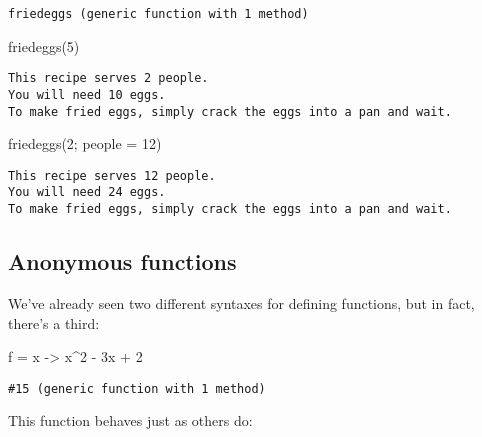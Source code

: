 \documentclass[
  letterpaper,
  DIV=11,
  numbers=noendperiod]{scrreprt}
\newenvironment{Shaded}{\begin{snugshade}}{\end{snugshade}}
\newcommand{\FloatTok}[1]{\textcolor[rgb]{0.68,0.00,0.00}{#1}}
\newcommand{\FunctionTok}[1]{\textcolor[rgb]{0.28,0.35,0.67}{#1}}
\newcommand{\NormalTok}[1]{\textcolor[rgb]{0.00,0.23,0.31}{#1}}
\newcommand{\OperatorTok}[1]{\textcolor[rgb]{0.37,0.37,0.37}{#1}}
\begin{document}
\begin{verbatim}
friedeggs (generic function with 1 method)
\end{verbatim}

\begin{Shaded}
\begin{Highlighting}[]
\FunctionTok{friedeggs}\NormalTok{(}\FloatTok{5}\NormalTok{)}
\end{Highlighting}
\end{Shaded}

\begin{verbatim}
This recipe serves 2 people.
You will need 10 eggs.
To make fried eggs, simply crack the eggs into a pan and wait.
\end{verbatim}

\begin{Shaded}
\begin{Highlighting}[]
\FunctionTok{friedeggs}\NormalTok{(}\FloatTok{2}\NormalTok{; people }\OperatorTok{=} \FloatTok{12}\NormalTok{)}
\end{Highlighting}
\end{Shaded}

\begin{verbatim}
This recipe serves 12 people.
You will need 24 eggs.
To make fried eggs, simply crack the eggs into a pan and wait.
\end{verbatim}

\hypertarget{anonymous-functions}{%
\subsection{Anonymous functions}\label{anonymous-functions}}

We've already seen two different syntaxes for defining functions, but in
fact, there's a third:

\begin{Shaded}
\begin{Highlighting}[]
\NormalTok{f }\OperatorTok{=}\NormalTok{ x }\OperatorTok{{-}\textgreater{}}\NormalTok{ x}\OperatorTok{\^{}}\FloatTok{2} \OperatorTok{{-}} \FloatTok{3}\NormalTok{x }\OperatorTok{+} \FloatTok{2}
\end{Highlighting}
\end{Shaded}

\begin{verbatim}
#15 (generic function with 1 method)
\end{verbatim}

This function behaves just as others do:
\end{document}

